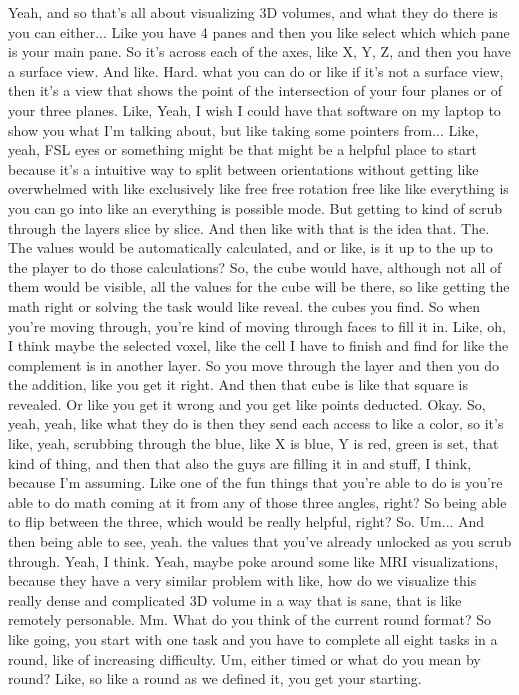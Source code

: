 \documentclass{article}
\begin{document}
Yeah, and so that's all about visualizing 3D volumes, and what they do there is you can either...
Like you have 4 panes and then you like select which which pane is your main pane. So it's across each of the axes, like X, Y, Z, and then you have a surface view. And like.
Hard.
what you can do or like if it's not a surface view, then it's a view that shows the point of the intersection of your four planes or of your three planes. Like,
Yeah, I wish I could have that software on my laptop to show you what I'm talking about, but like taking some pointers from...
Like, yeah, FSL eyes or something might be that might be a helpful place to start because it's a intuitive way to split between orientations without getting like overwhelmed with like exclusively like free free rotation free like like everything is you can go into like an everything is possible mode.
But getting to kind of scrub through the layers slice by slice.
And then like with that is the idea that.
The.
The values would be automatically calculated, and or like, is it up to the up to the player to do those calculations? So, the cube would have, although not all of them would be visible, all the values for the cube will be there, so like getting the math right or solving the task would like reveal.
the cubes you find. So when you're moving through, you're kind of moving through faces to fill it in. Like, oh, I think maybe the selected voxel, like the cell I have to finish and find for like the complement is in another layer. So you move through the layer and then you do the addition, like you get it right.
And then that cube is like that square is revealed. Or like you get it wrong and you get like points deducted. Okay.
So, yeah, yeah, like what they do is then they send each access to like a color, so it's like, yeah, scrubbing through the blue, like X is blue, Y is red, green is set, that kind of thing, and then that also the guys are filling it in and stuff, I think, because I'm assuming.
Like one of the fun things that you're able to do is you're able to do math coming at it from any of those three angles, right? So being able to flip between the three, which would be really helpful, right? So.
Um...
And then being able to see, yeah.
the values that you've already unlocked as you scrub through. Yeah, I think.
Yeah, maybe poke around some like MRI visualizations, because they have a very similar problem with like, how do we visualize this really dense and complicated 3D volume in a way that is sane, that is like remotely personable.
Mm.
What do you think of the current round format? So like going, you start with one task and you have to complete all eight tasks in a round, like of increasing difficulty. Um, either timed or what do you mean by round? Like, so like a round as we defined it, you get your starting.
\end{document}
